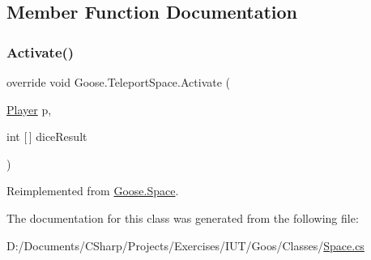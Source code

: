 \subsection{Member Function Documentation}
\mbox{\label{class_goose_1_1_teleport_space_ac85e087a0a946881741b947588a60a8c}} 
\subsubsection{\texorpdfstring{Activate()}{Activate()}}
{\footnotesize\ttfamily override void Goose.\+Teleport\+Space.\+Activate (\begin{DoxyParamCaption}\item[{\hyperlink{class_goose_1_1_player}{Player}}]{p,  }\item[{int \mbox{[}$\,$\mbox{]}}]{dice\+Result }\end{DoxyParamCaption})\hspace{0.3cm}{\ttfamily [virtual]}}



Reimplemented from \hyperlink{class_goose_1_1_space_a2c04479a1a06c1a35a6b1d8fb9056c49}{Goose.\+Space}.



The documentation for this class was generated from the following file\+:\begin{DoxyCompactItemize}
\item 
D\+:/\+Documents/\+C\+Sharp/\+Projects/\+Exercises/\+I\+U\+T/\+Goos/\+Classes/\hyperlink{_space_8cs}{Space.\+cs}\end{DoxyCompactItemize}
